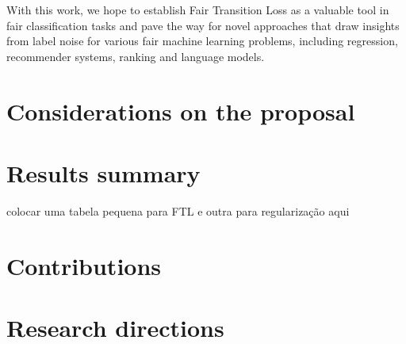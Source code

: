 With this work, we hope to establish Fair Transition Loss as a valuable tool in fair classification tasks and pave the way for novel approaches that draw insights from label noise for various fair machine learning problems, including regression, recommender systems, ranking and language models.

\section{Considerations on the proposal}

\section{Results summary}

colocar uma tabela pequena para FTL e outra para regularização aqui

\section{Contributions}

\section{Research directions}